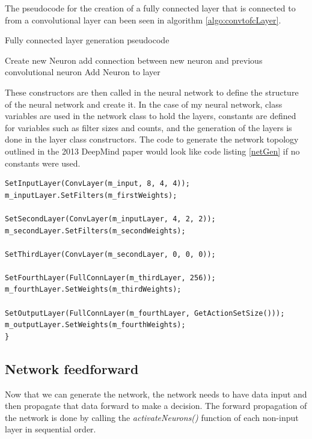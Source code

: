 \documentclass[10pt]{article}
\begin{document}
		The pseudocode for the creation of a fully connected layer that is connected to from a convolutional layer can been seen in algorithm \ref{algo:convtofcLayer}. \\

		\begin{algorithm}[h]
			\caption{Fully connected layer generation  pseudocode}
			\label{algo:convtofcLayer}
			\begin{algorithmic}[1]
					Create new Neuron 
						\State add connection between new neuron and previous convolutional neuron
					\EndFor
					\State Add Neuron to layer
				\EndFor
				\EndProcedure
			\end{algorithmic}
		\end{algorithm}
		
		These constructors are then called in the neural network to define the structure of the neural network and create it. In the case of my neural network, class variables are used in the network class to hold the layers, constants are defined for variables such as filter sizes and counts, and the generation of the layers is done in the layer class constructors. The code to generate the network topology outlined in the 2013 DeepMind paper would look like code listing \ref{netGen} if no constants were used.
				\renewcommand{\lstlistingname}{Code Listing}
		\begin{lstlisting}[caption={Network generation},label={netGen}]	
SetInputLayer(ConvLayer(m_input, 8, 4, 4));
m_inputLayer.SetFilters(m_firstWeights);

SetSecondLayer(ConvLayer(m_inputLayer, 4, 2, 2));
m_secondLayer.SetFilters(m_secondWeights);

SetThirdLayer(ConvLayer(m_secondLayer, 0, 0, 0));

SetFourthLayer(FullConnLayer(m_thirdLayer, 256));
m_fourthLayer.SetWeights(m_thirdWeights);

SetOutputLayer(FullConnLayer(m_fourthLayer, GetActionSetSize()));
m_outputLayer.SetWeights(m_fourthWeights);
}

		\end{lstlisting}

	\medskip
	
	\subsection{Network feedforward}
	Now that we can generate the network, the network needs to have data input and then propagate that data forward to make a decision. The forward propagation of the network is done by calling the \textit{activateNeurons()} function of each non-input layer in sequential order.\\
	
\end{document}
